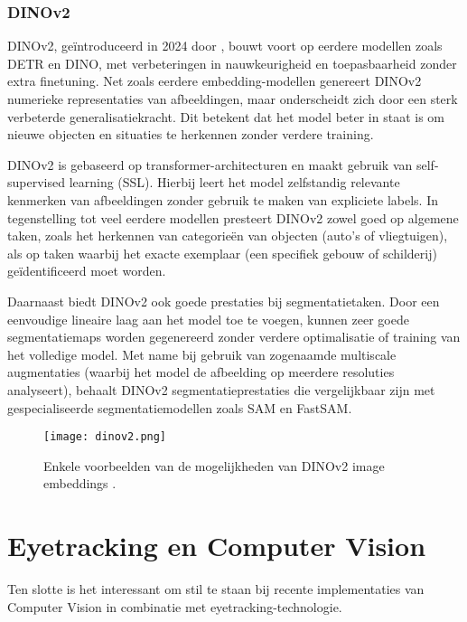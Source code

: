 \subsubsection{DINOv2}

DINOv2, geïntroduceerd in 2024 door \textcite{Oquab2024}, bouwt voort op eerdere modellen zoals DETR en DINO, met verbeteringen in nauwkeurigheid en toepasbaarheid zonder extra finetuning. 
Net zoals eerdere embedding-modellen genereert DINOv2 numerieke representaties van afbeeldingen, maar onderscheidt zich door een sterk verbeterde generalisatiekracht. 
Dit betekent dat het model beter in staat is om nieuwe objecten en situaties te herkennen zonder verdere training.

DINOv2 is gebaseerd op transformer-architecturen en maakt gebruik van self-supervised learning (SSL). 
Hierbij leert het model zelfstandig relevante kenmerken van afbeeldingen zonder gebruik te maken van expliciete labels. 
In tegenstelling tot veel eerdere modellen presteert DINOv2 zowel goed op algemene taken, zoals het herkennen van categorieën van objecten (auto's of vliegtuigen), als op taken waarbij het exacte exemplaar (een specifiek gebouw of schilderij) geïdentificeerd moet worden. 

Daarnaast biedt DINOv2 ook goede prestaties bij segmentatietaken. Door een eenvoudige lineaire laag aan het model toe te voegen, kunnen zeer goede segmentatiemaps worden gegenereerd zonder verdere optimalisatie of training van het volledige model. 
Met name bij gebruik van zogenaamde multiscale augmentaties (waarbij het model de afbeelding op meerdere resoluties analyseert), 
behaalt DINOv2 segmentatieprestaties die vergelijkbaar zijn met gespecialiseerde segmentatiemodellen zoals SAM en FastSAM.

\begin{figure}[H]
  \centering
  \texttt{[image: dinov2.png]}
  \caption[]{\label{fig:dinov2}Enkele voorbeelden van de mogelijkheden van DINOv2 image embeddings \autocite{Oquab2024}.}
\end{figure}

\section{Eyetracking en Computer Vision}

Ten slotte is het interessant om stil te staan bij recente implementaties van Computer Vision in combinatie met eyetracking-technologie.

